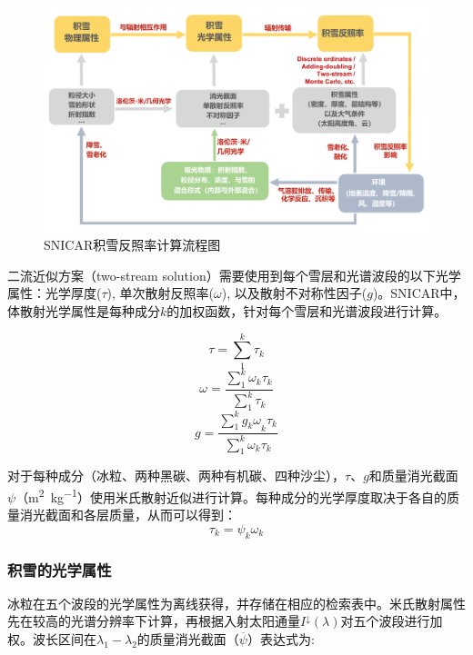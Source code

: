 {
  \begin{figure}[htbp]
    \centering
    \includegraphics[width=1\columnwidth]{Figures/辐射过程及辐射通量计算/SNICAR模型计算流程图_v2.png}
    \caption{SNICAR积雪反照率计算流程图\citep{he2020SnowAlbedoRadiative}}
    \label{fig:SNICAR模型流程图}
  \end{figure}
}

二流近似方案（two-stream
solution）需要使用到每个雪层和光谱波段的以下光学属性：光学厚度($\tau$),
单次散射反照率($\omega$),
以及散射不对称性因子($g$)。SNICAR中，体散射光学属性是每种成分$k$的加权函数，针对每个雪层和光谱波段进行计算。

\begin{equation}
  \tau = \sum_{1}^{k}\tau_{k}
\end{equation}
%
\begin{equation}
  \omega = \frac{\sum_{1}^{k}\omega_{k}\tau_{k}}{\sum_{1}^{k}\tau_{k}}
\end{equation}
%
\begin{equation}
  g = \frac{\sum_{1}^{k}{g_{k}\omega}_{k}\tau_{k}}{\sum_{1}^{k}\omega_{k}\tau_{k}}
\end{equation}

对于每种成分（冰粒、两种黑碳、两种有机碳、四种沙尘），$\tau$、$g$和质量消光截面$\psi$（\unit{m^2.kg^{-1}}）使用米氏散射近似进行计算。每种成分的光学厚度取决于各自的质量消光截面和各层质量，从而可以得到：
\begin{equation}
  \tau_{k} = \psi_{k}\omega_{k}
\end{equation}

\subsubsection{积雪的光学属性}
冰粒在五个波段的光学属性为离线获得，并存储在相应的检索表中。米氏散射属性先在较高的光谱分辨率下计算，再根据入射太阳通量\(I^{\downarrow}(\lambda)\)对五个波段进行加权。波长区间在$\lambda_{1}-\lambda_{2}$的质量消光截面（\(\overline{\psi}\)）表达式为:

